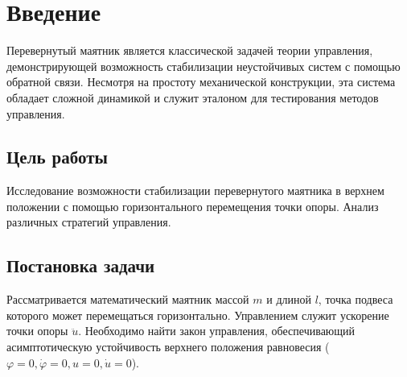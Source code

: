 \section{Введение}

Перевернутый маятник является классической задачей теории управления, демонстрирующей возможность стабилизации неустойчивых систем с помощью обратной связи. Несмотря на простоту механической конструкции, эта система обладает сложной динамикой и служит эталоном для тестирования методов управления.

\subsection{Цель работы}
Исследование возможности стабилизации перевернутого маятника в верхнем положении с помощью горизонтального перемещения точки опоры. Анализ различных стратегий управления.

\subsection{Постановка задачи}
Рассматривается математический маятник массой \(m\) и длиной \(l\), точка подвеса которого может перемещаться горизонтально. Управлением служит ускорение точки опоры \(\ddot{u}\). Необходимо найти закон управления, обеспечивающий асимптотическую устойчивость верхнего положения равновесия (\(\varphi = 0, \dot{\varphi} = 0, u = 0, \dot{u} = 0\)).